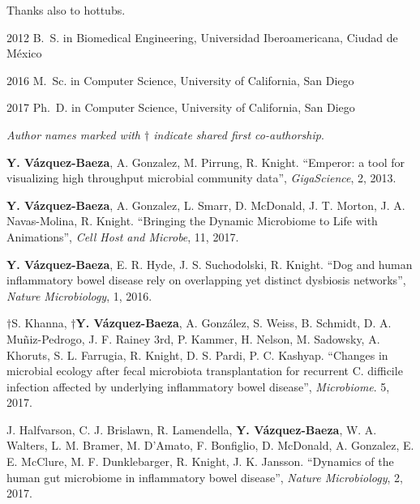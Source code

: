 \begin{frontmatter}
\begin{acknowledgements}
 Thanks also to hottubs.
\end{acknowledgements}


%
%
\begin{vitapage}
\begin{vita}
  \item[2012] B.~S. in Biomedical Engineering, Universidad Iberoamericana, Ciudad de M\'exico
  \item[2016] M.~Sc. in Computer Science, University of California, San Diego
  \item[2017] Ph.~D. in Computer Science, University of California, San Diego 
\end{vita}


\begin{publications}

    \item \textsl{Author names marked with $\dagger$ indicate shared first co-authorship}.

    \item \textbf{Y. V\'azquez-Baeza}, A. Gonzalez, M. Pirrung, R. Knight. ``Emperor: a tool for visualizing high throughput microbial community data'', \emph{GigaScience}, 2, 2013.

    \item \textbf{Y. V\'azquez-Baeza}, A. Gonzalez, L. Smarr, D. McDonald, J. T. Morton, J. A. Navas-Molina, R. Knight. ``Bringing the Dynamic Microbiome to Life with Animations'', \emph{Cell Host and Microbe}, 11, 2017.

    \item \textbf{Y. V\'azquez-Baeza}, E. R. Hyde, J. S. Suchodolski, R. Knight. ``Dog and human inflammatory bowel disease rely on overlapping yet distinct dysbiosis networks'', \emph{Nature Microbiology}, 1, 2016.

    \item  $\dagger$S. Khanna, \textbf{$\dagger$Y. V\'azquez-Baeza}, A. Gonz\'alez, S. Weiss, B. Schmidt, D. A. Muñiz-Pedrogo, J. F. Rainey 3rd, P. Kammer, H. Nelson, M. Sadowsky, A. Khoruts, S. L. Farrugia, R. Knight, D. S. Pardi, P. C. Kashyap. ``Changes in microbial ecology after fecal microbiota transplantation for recurrent C. difficile infection affected by underlying inflammatory bowel disease'', \emph{Microbiome}. 5, 2017.

    \item J. Halfvarson, C. J. Brislawn, R. Lamendella, \textbf{Y. V\'azquez-Baeza}, W. A. Walters, L. M. Bramer, M. D'Amato, F. Bonfiglio, D. McDonald, A. Gonzalez, E. E. McClure, M. F. Dunklebarger, R. Knight, J. K. Jansson. ``Dynamics of the human gut microbiome in inflammatory bowel disease'', \emph{Nature Microbiology}, 2, 2017.
  

\end{publications}
\end{vitapage}
\end{frontmatter}
